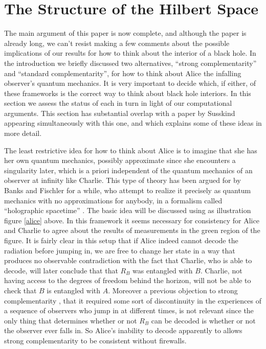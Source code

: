 \documentclass[12pt]{article}
\begin{document}
\section{The Structure of the Hilbert Space} \label{options}
The main argument of this paper is now complete, and although the paper is already long, we can't resist making a few comments about the possible implications of our results for how to think about the interior of a black hole.  In the introduction we briefly discussed two alternatives, ``strong complementarity'' and ``standard complementarity'', for how to think about Alice the infalling observer's quantum mechanics.  It is very important to decide which, if either, of these frameworks is the correct way to think about black hole interiors.  In this section we assess the status of each in turn in light of our computational arguments.  This section has substantial overlap with a paper by Susskind \cite{Susskind:2013tg} appearing simultaneously with this one, and which explains some of these ideas in more detail.

The least restrictive idea for how to think about Alice is to imagine that she has her own quantum mechanics, possibly approximate since she encounters a singularity later, which is a priori independent of the quantum mechanics of an observer at infinity like Charlie.  This type of theory has been argued for by Banks and Fischler for a while, who attempt to realize it precisely as quantum mechanics with no approximations for anybody, in a formalism called ``holographic spacetime'' \cite{Banks:2001px,Banks:2011av}.  The basic idea will be discussed using as illustration figure \ref{alice} above.  In this framework it seems necessary for consistency \cite{bousso,harlow} for Alice and Charlie to agree about the results of measurements in the green region of the figure.  It is fairly clear in this setup that if Alice indeed cannot decode the radiation before jumping in, we are free to change her state in a way that produces no observable contradiction with the fact that Charlie, who is able to decode, will later conclude that that $R_B$ was entangled with $B$.  Charlie, not having access to the degrees of freedom behind the horizon, will not be able to check that $B$ is entangled with $A$.  Moreover a previous objection to strong complementarity \cite{Almheiri:2012rt}, that it required some sort of discontinuity in the experiences of a sequence of observers who jump in at different times, is not relevant since the only thing that determines whether or not $R_B$ can be decoded is whether or not the observer ever falls in.  So Alice's inability to decode apparently to allows strong complementarity to be consistent without firewalls.
\end{document}
